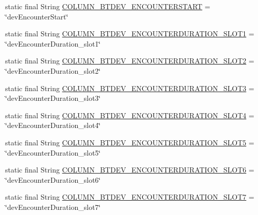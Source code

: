 \begin{DoxyCompactItemize}
\item 
static final String \hyperlink{classcs_1_1usense_1_1db_1_1_usense_s_q_lite_helper_aee408d816067ab69e008db348da291b9}{C\+O\+L\+U\+M\+N\+\_\+\+B\+T\+D\+E\+V\+\_\+\+E\+N\+C\+O\+U\+N\+T\+E\+R\+S\+T\+A\+R\+T} = \char`\"{}dev\+Encounter\+Start\char`\"{}
\item 
static final String \hyperlink{classcs_1_1usense_1_1db_1_1_usense_s_q_lite_helper_ad8820f02a90e03ca9cf51e534b313511}{C\+O\+L\+U\+M\+N\+\_\+\+B\+T\+D\+E\+V\+\_\+\+E\+N\+C\+O\+U\+N\+T\+E\+R\+D\+U\+R\+A\+T\+I\+O\+N\+\_\+\+S\+L\+O\+T1} = \char`\"{}dev\+Encounter\+Duration\+\_\+slot1\char`\"{}
\item 
static final String \hyperlink{classcs_1_1usense_1_1db_1_1_usense_s_q_lite_helper_a45928db8e7e417e578a8153081d460ea}{C\+O\+L\+U\+M\+N\+\_\+\+B\+T\+D\+E\+V\+\_\+\+E\+N\+C\+O\+U\+N\+T\+E\+R\+D\+U\+R\+A\+T\+I\+O\+N\+\_\+\+S\+L\+O\+T2} = \char`\"{}dev\+Encounter\+Duration\+\_\+slot2\char`\"{}
\item 
static final String \hyperlink{classcs_1_1usense_1_1db_1_1_usense_s_q_lite_helper_af81dd682aec6dd31cf4bd7fac96d9307}{C\+O\+L\+U\+M\+N\+\_\+\+B\+T\+D\+E\+V\+\_\+\+E\+N\+C\+O\+U\+N\+T\+E\+R\+D\+U\+R\+A\+T\+I\+O\+N\+\_\+\+S\+L\+O\+T3} = \char`\"{}dev\+Encounter\+Duration\+\_\+slot3\char`\"{}
\item 
static final String \hyperlink{classcs_1_1usense_1_1db_1_1_usense_s_q_lite_helper_a6b03315682cd23d39c29eb1214384c0c}{C\+O\+L\+U\+M\+N\+\_\+\+B\+T\+D\+E\+V\+\_\+\+E\+N\+C\+O\+U\+N\+T\+E\+R\+D\+U\+R\+A\+T\+I\+O\+N\+\_\+\+S\+L\+O\+T4} = \char`\"{}dev\+Encounter\+Duration\+\_\+slot4\char`\"{}
\item 
static final String \hyperlink{classcs_1_1usense_1_1db_1_1_usense_s_q_lite_helper_a357bdf6b263b3154c55d25d90461cda4}{C\+O\+L\+U\+M\+N\+\_\+\+B\+T\+D\+E\+V\+\_\+\+E\+N\+C\+O\+U\+N\+T\+E\+R\+D\+U\+R\+A\+T\+I\+O\+N\+\_\+\+S\+L\+O\+T5} = \char`\"{}dev\+Encounter\+Duration\+\_\+slot5\char`\"{}
\item 
static final String \hyperlink{classcs_1_1usense_1_1db_1_1_usense_s_q_lite_helper_addeb176681ab91528123d9510c12139f}{C\+O\+L\+U\+M\+N\+\_\+\+B\+T\+D\+E\+V\+\_\+\+E\+N\+C\+O\+U\+N\+T\+E\+R\+D\+U\+R\+A\+T\+I\+O\+N\+\_\+\+S\+L\+O\+T6} = \char`\"{}dev\+Encounter\+Duration\+\_\+slot6\char`\"{}
\item 
static final String \hyperlink{classcs_1_1usense_1_1db_1_1_usense_s_q_lite_helper_ac3bc35d0f54bed38b8f3da6d860124a7}{C\+O\+L\+U\+M\+N\+\_\+\+B\+T\+D\+E\+V\+\_\+\+E\+N\+C\+O\+U\+N\+T\+E\+R\+D\+U\+R\+A\+T\+I\+O\+N\+\_\+\+S\+L\+O\+T7} = \char`\"{}dev\+Encounter\+Duration\+\_\+slot7\char`\"{}

\end{DoxyCompactItemize}
